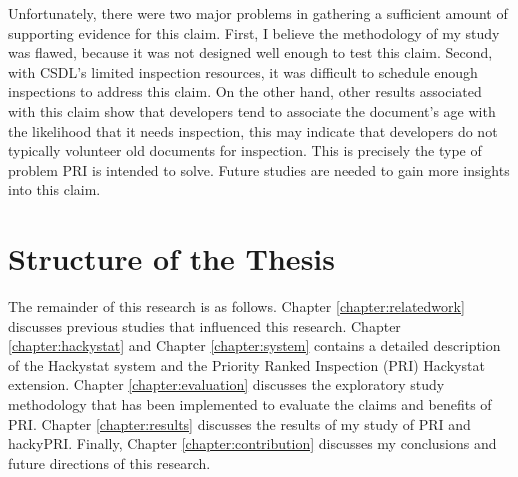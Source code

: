 Unfortunately, there were two major problems in gathering a sufficient
amount of supporting evidence for this claim. First, I believe the
methodology of my study was flawed, because it was not designed well enough
to test this claim. Second, with CSDL's limited inspection resources, it
was difficult to schedule enough inspections to address this claim. On the
other hand, other results associated with this claim show that developers
tend to associate the document's age with the likelihood that it needs
inspection, this may indicate that developers do not typically volunteer
old documents for inspection. This is precisely the type of problem PRI is
intended to solve. Future studies are needed to gain more insights into
this claim.





\section{Structure of the Thesis}
The remainder of this research is as follows. Chapter
\ref{chapter:relatedwork} discusses previous studies that influenced this
research. Chapter \ref{chapter:hackystat} and Chapter \ref{chapter:system}
contains a detailed description of the Hackystat system and the Priority
Ranked Inspection (PRI) Hackystat extension. Chapter
\ref{chapter:evaluation} discusses the exploratory study methodology that
has been implemented to evaluate the claims and benefits of PRI. Chapter
\ref{chapter:results} discusses the results of my study of PRI and
hackyPRI. Finally, Chapter \ref{chapter:contribution} discusses my
conclusions and future directions of this research.
























